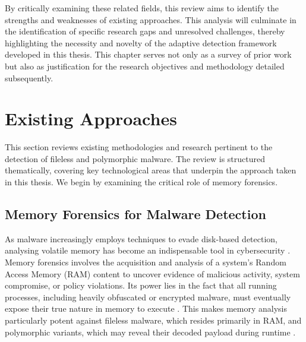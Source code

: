 By critically examining these related fields, this review aims to identify the strengths and weaknesses of existing approaches. This analysis will culminate in the identification of specific research gaps and unresolved challenges, thereby highlighting the necessity and novelty of the adaptive detection framework developed in this thesis. This chapter serves not only as a survey of prior work but also as justification for the research objectives and methodology detailed subsequently.

\section{Existing Approaches}
\label{sec:existing_approaches}

This section reviews existing methodologies and research pertinent to the detection of fileless and polymorphic malware. The review is structured thematically, covering key technological areas that underpin the approach taken in this thesis. We begin by examining the critical role of memory forensics.

\subsection{Memory Forensics for Malware Detection}
\label{subsec:mem_forensics}

As malware increasingly employs techniques to evade disk-based detection, analysing volatile memory has become an indispensable tool in cybersecurity \cite{kara2022fileless}. Memory forensics involves the acquisition and analysis of a system's Random Access Memory (RAM) content to uncover evidence of malicious activity, system compromise, or policy violations. Its power lies in the fact that all running processes, including heavily obfuscated or encrypted malware, must eventually expose their true nature in memory to execute \cite{bozkir2021catch}. This makes memory analysis particularly potent against fileless malware, which resides primarily in RAM, and polymorphic variants, which may reveal their decoded payload during runtime \cite{sihag2021assistive, hanchenko2024analysis}.

